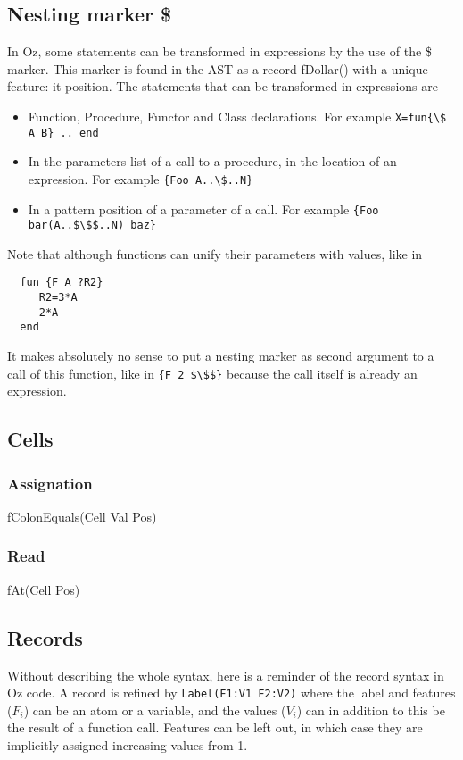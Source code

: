 \documentclass[a4paper]{memoir}
\begin{document}
\subsection{Nesting marker \$}\label{sec:input:nestingmarker}
In Oz, some statements can be transformed in expressions by the use of the \$ marker. This marker is found in the AST as a record fDollar() with a unique feature: it position.
The statements that can be transformed in expressions are
\begin{itemize}
  \item Function, Procedure, Functor and Class declarations. For example
    \lstinline!X=fun{\$ A B} .. end!
  \item In the parameters list of a call to a procedure, in the location of an
    expression. For example \lstinline!{Foo A..\$..N}!
  \item In a pattern position of a parameter of a call. For example
    \lstinline[mathescape]!{Foo bar(A..$\$$..N) baz}!
\end{itemize}
Note that although functions can unify their parameters with values, like in 
\begin{lstlisting}
  fun {F A ?R2}
     R2=3*A
     2*A
  end
\end{lstlisting}
It makes absolutely no sense to put a nesting marker as second argument to a call of this function, like in 
\lstinline[mathescape]!{F 2 $\$$}! because the call itself is already an expression.


\subsection{Cells}\label{sec:input:cells}
\subsubsection{Assignation}
fColonEquals(Cell Val Pos) %
\subsubsection{Read}
fAt(Cell Pos) %
\subsection{Records}\label{sec:input:records}
Without describing the whole syntax, here is a reminder of the record syntax in Oz code. A record is refined by \lstinline!Label(F1:V1 F2:V2)! where the label and features ($F_i$) can be an atom or a variable, and the values ($V_i$) can in addition to this be the result of a function call. Features can be left out, in which case they are implicitly assigned increasing values from 1.
\end{document}
